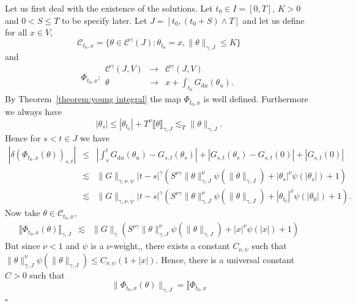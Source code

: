 \documentclass[a4paper,11pt]{article}
\newcommand{\mathd}{\mathrm{d}}
\newcommand{\nocomma}{}
\newenvironment{proof}{{\sc Proof.}}{\hfill$\square$}
\newcommand{\CC}{\mathscr C}
\begin{document}
\begin{proof}
  Let us first deal with the existence of the solutions. Let $t_{0} \in I= [
  0,T ]$, $K>0$ and $0<S \leqslant T$ to be specify later. Let $J= [t_{0}
  ,(t_{0} +S) \wedge T]$ and let us define for all $x \in V$,
  \[ \mathcal{C}_{t_{0} ,x} = \{\theta \in \CC^{\gamma} (J): \theta_{t_{0}}
     =x,\| \theta \|_{\gamma ,J} \leqslant K\} \]
  and
  \[ \Phi_{t_{0} ,x} : \begin{array}{ccc}
       \CC^{\gamma} (J,V) & \rightarrow & \CC^{\gamma} (J \nocomma ,V)\\
       \theta & \rightarrow & x+ \int_{t_{0}}^{.} G_{\mathd u} ( \theta_{u} ).
     \end{array} \]
  By Theorem~\ref{theorem:young integral} the map $\Phi_{t_{0} ,x}$ is well defined.
  Furthermore we always have
  \[ | \theta_{s} | \leqslant | \theta_{t_{0}} | +T^{\nu} \llbracket \theta
     \rrbracket_{\gamma ,J} \lesssim_{T} \| \theta \|_{\gamma ,J} .\]
  Hence for $s<t \in J$ we have
  \begin{eqnarray}
    | \delta ( \Phi_{t_{0} ,x} ( \theta ))_{s,t} | & \leqslant & \left\lvert
    \int_{s}^{t} G_{\mathd u} ( \theta_{u} )-G_{s,t} ( \theta_{s} ) \right\lvert +
    |G_{s,t} ( \theta_{s} )-G_{s,t} (0)| + |G_{s,t} (0)| \nonumber\\
    & \lesssim & \|G\|_{\gamma , \nu , \psi}  |t-s|^{\gamma}  ( S^{\nu
    \gamma} \| \theta \|^{\nu}_{\gamma ,J} \psi ( \| \theta \|_{\gamma ,J} ) +
    | \theta_{s} |^{\nu} \psi ( | \theta_{s} | ) +1 ) \nonumber\\
    & \lesssim & \|G\|_{\gamma , \nu , \psi}  |t-s|^{\gamma}  ( S^{\nu
    \gamma} \| \theta \|^{\nu}_{\gamma ,J} \psi ( \| \theta \|_{\gamma ,J} )
    +| \theta_{t_{0}} |^{\nu} \psi ( | \theta_{0} | ) +1 ) . \label{majoration
    bound}
  \end{eqnarray}
  Now take $\theta \in \mathcal{C}_{t_{0} ,x}$,
  \begin{eqnarray*}
    \llbracket \Phi_{t_{0} ,x} ( \theta ) \rrbracket_{\gamma ,J} & \lesssim &
    \|G\|_{\gamma} (S^{\nu \gamma} \| \theta \|^{\nu}_{\gamma ,J} \psi ( \|
    \theta \|_{\gamma ,J} ) +|x|^{\nu} \psi ( | x | ) +1)
  \end{eqnarray*}
  But since $\nu <1$ and $\psi$ is a $\nu$-weight,, there exists a constant
  $C_{\nu , \psi}$ such that $\| \theta \|^{\nu}_{\gamma ,J} \psi ( \| \theta
  \|_{\gamma ,J} ) \leqslant C_{\nu , \psi} ( 1+ | x | )$. Hence, there is a
  universal constant $C>0$ such that
  \[ \| \Phi_{t_{0} ,x} ( \theta ) \|_{\gamma ,J} = \llbracket \Phi_{t_{0} ,x}
\]
\end{proof}
\end{document}
